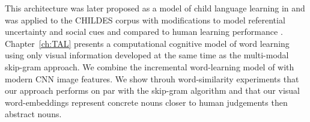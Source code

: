 This architecture was later proposed as a model of child language learning in and
was applied to the CHILDES corpus \cite{macwhinney2014childes} with modifications to model referential
uncertainty and social cues \cite{lazaridou2016multimodal} and compared to human learning performance \cite{lazaridou2017multimodal}.
Chapter~\ref{ch:TAL} presents a computational cognitive model of word learning using only
visual information developed at the same time as the multi-modal skip-gram approach. We combine
the incremental word-learning model of \cite{fazly.etal.10csj} with modern CNN image features.
We show throuh word-similarity experiments that our approach performs on par with the skip-gram
algorithm and that our visual word-embeddings represent concrete nouns closer to human judgements
then abstract nouns.

